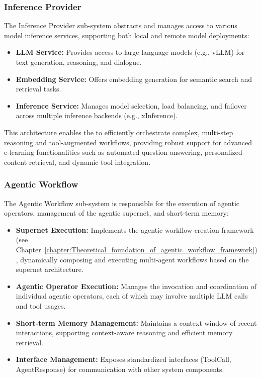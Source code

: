 \documentclass[../Main.tex]{subfiles}
\begin{document}
	\subsubsection{Inference Provider}
	\label{section:4.1.3.4_inference_provider} The Inference Provider sub-system abstracts
	and manages access to various model inference services, supporting both local
	and remote model deployments:

	\begin{itemize}
		\item \textbf{LLM Service:} Provides access to large language models (e.g., vLLM)
			for text generation, reasoning, and dialogue.

		\item \textbf{Embedding Service:} Offers embedding generation for semantic
			search and retrieval tasks.

		\item \textbf{Inference Service:} Manages model selection, load balancing,
			and failover across multiple inference backends (e.g., xInference).
	\end{itemize}

	This architecture enables the  to efficiently orchestrate complex,
	multi-step reasoning and tool-augmented workflows, providing robust support for
	advanced e-learning functionalities such as automated question answering,
	personalized content retrieval, and dynamic tool integration.

	\subsubsection{Agentic Workflow}
	\label{section:4.1.3.3_agentic_workflow} The Agentic Workflow sub-system is responsible
	for the execution of agentic operators, management of the agentic supernet, and
	short-term memory:

	\begin{itemize}
		\item \textbf{Supernet Execution:} Implements the agentic workflow creation
			framework (see Chapter~\ref{chapter:Theoretical_foundation_of_agentic_workflow_framework}), dynamically composing and
			executing multi-agent workflows based on the supernet architecture.

		\item \textbf{Agentic Operator Execution:} Manages the invocation and
			coordination of individual agentic operators, each of which may involve multiple
			LLM calls and tool usages.

		\item \textbf{Short-term Memory Management:} Maintains a context window of
			recent interactions, supporting context-aware reasoning and efficient memory
			retrieval.

		\item \textbf{Interface Management:} Exposes standardized interfaces (ToolCall,
			AgentResponse) for communication with other system components.
	\end{itemize}
\end{document}
